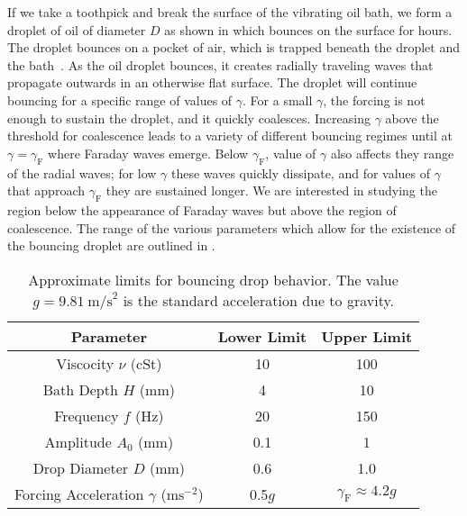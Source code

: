 	    If we take a toothpick and break the surface of the vibrating oil bath, we form a droplet of oil of diameter $D$ as shown in  which bounces on the surface for hours. The droplet bounces on a pocket of air, which is trapped beneath the droplet and the bath~. As the oil droplet bounces, it creates radially traveling waves that propagate outwards in an otherwise flat surface. The droplet will continue bouncing for a specific range of values of $\gamma$. For a small $\gamma$, the forcing is not enough to sustain the droplet, and it quickly coalesces. Increasing $\gamma$ above the threshold for coalescence leads to a variety of different bouncing regimes until at $\gamma = \gamma_\mathrm{F}$ where Faraday waves emerge. Below $\gamma_\mathrm{F}$, value of $\gamma$ also affects they range of the radial waves; for low $\gamma$ these waves quickly dissipate, and for values of $\gamma$ that approach $\gamma_\mathrm{F}$ they are sustained longer. We are interested in studying the region below the appearance of Faraday waves but above the region of coalescence. The range of the various parameters which allow for the existence of the bouncing droplet are outlined in  \cite{pilot-wave}. 
	      
	       \begin{table}[htdp] 
\caption[Basic Table 1]{Approximate limits for bouncing drop behavior. The value $g = 9.81~\mathrm{m/s}^{2}$ is the standard acceleration due to gravity.} 
\begin{center} 
\begin{tabular}{c c c} 
\toprule 
  Parameter &  Lower Limit & Upper Limit \\
  \midrule
Viscocity $\nu$ (cSt) & 10 & 100 \\ 
Bath Depth $H$ (mm) & 4 & 10 \\
Frequency $f$ (Hz) & 20 & 150 \\
Amplitude $A_0$ (mm) & 0.1 & 1 \\
Drop Diameter $D$ (mm) & 0.6 & 1.0 \\
Forcing Acceleration $\gamma$ ($\mathrm{ms}^{-2}$) & 0.5$g$ & $\gamma_\mathrm{F} \approx 4.2g$ \\
\bottomrule 
\end{tabular}
\end{center}
\label{approxlimits} 
\end{table}	

